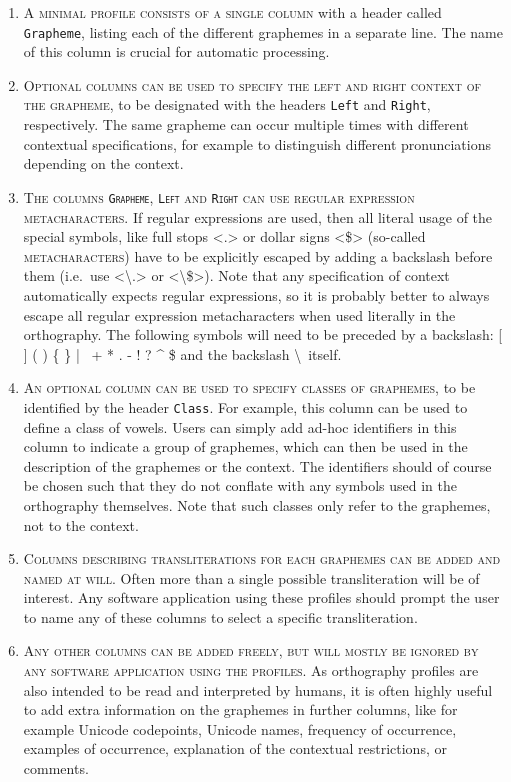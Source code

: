 \begin{enumerate}
	\def\labelenumi{A\arabic{enumi}.} \setcounter{enumi}{4} 
	\item \textsc{A minimal profile consists of a single column} with a header
       called \texttt{Grapheme}, listing each of the different graphemes in a
       separate line. The name of this column is crucial for automatic 
       processing.
	\item \textsc{Optional columns can be used to specify the left and right
       context of the grapheme}, to be designated with the headers \texttt{Left}
       and \texttt{Right}, respectively. The same grapheme can occur multiple
       times with different contextual specifications, for example to
       distinguish different pronunciations depending on the context. 
	\item \textsc{The columns \texttt{Grapheme}, \texttt{Left} and \texttt{Right}
       can use regular expression metacharacters.} If regular expressions are
       used, then all literal usage of the special symbols, like full stops <.>
       or dollar signs <\$> (so-called \textsc{metacharacters}) have to be
       explicitly escaped by adding a backslash before them (i.e.~use
       <\textbackslash.> or <\textbackslash\$>). Note that any specification of
       context automatically expects regular expressions, so it is probably
       better to always escape all regular expression metacharacters when used
       literally in the orthography. The following symbols will need to be
       preceded by a backslash: {[} {]} ( ) \{ \} | ~+ * . - ! ? \^{} \$ and the
       backslash \textbackslash~itself. 
	\item \textsc{An optional column can be used to specify classes of graphemes},
       to be identified by the header \texttt{Class}. For example, this column
       can be used to define a class of vowels. Users can simply add ad-hoc
       identifiers in this column to indicate a group of graphemes, which can
       then be used in the description of the graphemes or the context. The
       identifiers should of course be chosen such that they do not conflate
       with any symbols used in the orthography themselves. Note that such
       classes only refer to the graphemes, not to the context. 
	\item \textsc{Columns describing transliterations for each graphemes can be
       added and named at will}. Often more than a single possible
       transliteration will be of interest. Any software application using these
       profiles should prompt the user to name any of these columns to select a
       specific transliteration. 
	\item \textsc{Any other columns can be added freely, but will mostly be ignored
       by any software application using the profiles}. As orthography profiles
       are also intended to be read and interpreted by humans, it is often
       highly useful to add extra information on the graphemes in further
       columns, like for example Unicode codepoints, Unicode names, frequency of
       occurrence, examples of occurrence, explanation of the contextual
       restrictions, or comments. 
 \end{enumerate}

